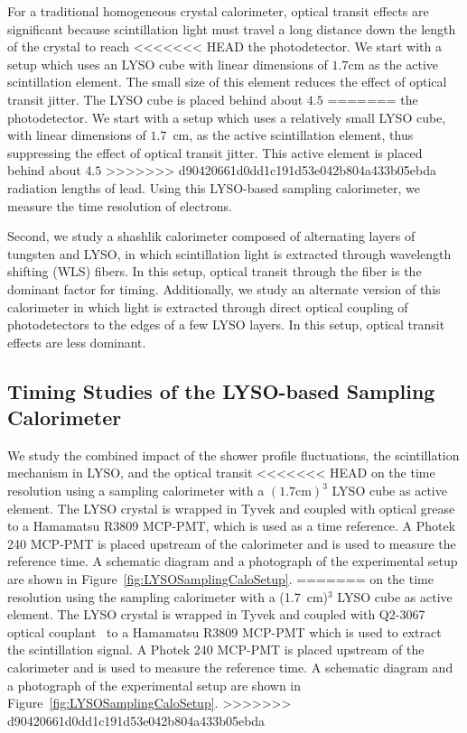 \documentclass[12pt]{article}
\begin{document}
For a traditional homogeneous crystal calorimeter, optical
transit effects are significant because scintillation light must
travel a long distance down the length of the crystal to reach
<<<<<<< HEAD
the photodetector. We start with a setup which uses an LYSO cube
with linear dimensions of $1.7\mathrm{cm}$ as the 
active scintillation element. The small size of this element reduces the effect of 
optical transit jitter. The LYSO cube is placed behind about $4.5$ 
=======
the photodetector. We start with a setup which uses a relatively 
small LYSO cube, with linear dimensions of $1.7$~cm, as the 
active scintillation element, thus suppressing the effect of 
optical transit jitter. This active element is placed behind about $4.5$ 
>>>>>>> d90420661d0dd1c191d53e042b804a433b05ebda
radiation lengths of lead. Using this LYSO-based sampling calorimeter,
we measure the time resolution of electrons.

Second, we study a shashlik calorimeter composed of alternating layers 
of tungsten and LYSO, in which scintillation light is extracted
through wavelength shifting (WLS) fibers. In this setup, optical transit through
the fiber is the dominant factor for timing. Additionally, we
study an alternate version of this calorimeter in which
light is extracted through direct optical coupling of photodetectors
to the edges of a few LYSO layers. In this setup, optical transit effects 
are less dominant.



\subsection{Timing Studies of the LYSO-based Sampling Calorimeter}

We study the combined impact of the shower profile fluctuations,
the scintillation mechanism in LYSO, and the optical transit
<<<<<<< HEAD
on the time resolution using a sampling calorimeter with a
$(1.7\mathrm{cm})^{3}$ LYSO cube as active element. 
The LYSO crystal is wrapped in Tyvek and  
coupled with optical grease to a Hamamatsu R3809 MCP-PMT,
which is used as a time reference. A Photek 240 MCP-PMT is placed 
upstream of the calorimeter and is used to measure the reference 
time. A schematic diagram and a photograph of the experimental 
setup are shown in Figure~\ref{fig:LYSOSamplingCaloSetup}. 
=======
on the time resolution using the sampling calorimeter with a
(1.7~cm)$^3$ LYSO cube as active element. 
The LYSO crystal is wrapped in Tyvek and  
coupled with Q2-3067 optical couplant~\cite{grease} to a Hamamatsu R3809 MCP-PMT
which is used to extract the scintillation signal. 
A Photek 240 MCP-PMT is placed upstream of the calorimeter and 
is used to measure the reference time. A schematic diagram
and a photograph of the experimental setup
are shown in Figure~\ref{fig:LYSOSamplingCaloSetup}. 
>>>>>>> d90420661d0dd1c191d53e042b804a433b05ebda
\end{document}
